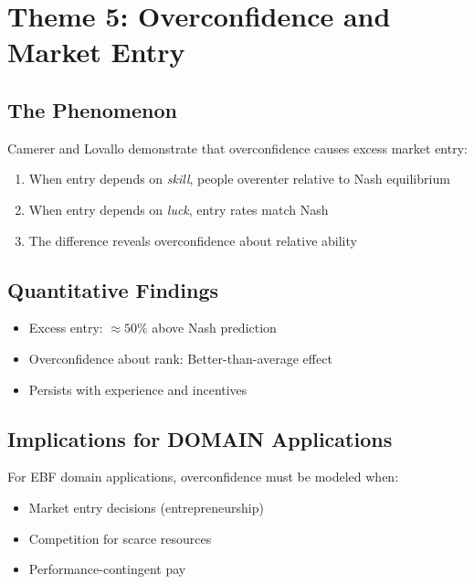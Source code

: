 \section{Theme 5: Overconfidence and Market Entry}
\label{sec:ca-overconfidence}

\subsection{The Phenomenon}

Camerer and Lovallo \citep{PAP-camerer1999overconfidence} demonstrate that overconfidence causes excess market entry:

\begin{enumerate}[nosep]
\item When entry depends on \textit{skill}, people overenter relative to Nash equilibrium
\item When entry depends on \textit{luck}, entry rates match Nash
\item The difference reveals overconfidence about relative ability
\end{enumerate}

\subsection{Quantitative Findings}

\begin{itemize}[nosep]
\item Excess entry: $\approx 50\%$ above Nash prediction
\item Overconfidence about rank: Better-than-average effect
\item Persists with experience and incentives
\end{itemize}

\subsection{Implications for DOMAIN Applications}

For EBF domain applications, overconfidence must be modeled when:
\begin{itemize}[nosep]
\item Market entry decisions (entrepreneurship)
\item Competition for scarce resources
\item Performance-contingent pay
\end{itemize}


